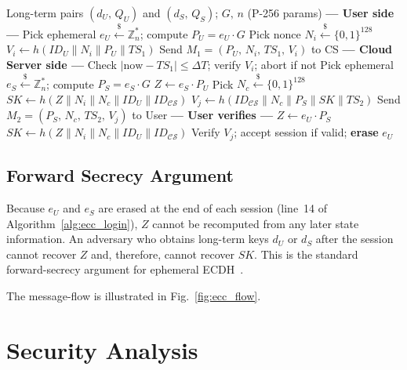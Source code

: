 \documentclass[journal]{IEEEtran}
\newcommand{\ID}{\mathit{ID}}          %
\newcommand{\SK}{\mathit{SK}}          %
\newcommand{\h}[1]{h(#1)}             %
\newcommand{\TS}{\mathit{TS}}          %
\newcommand{\CS}{\mathcal{CS}}         %
\begin{document}
\begin{algorithm}[!t]
\caption{ECC P-256 Login \& Key Agreement}
\label{alg:ecc_login}
\begin{algorithmic}[1]
\Require Long-term pairs $(d_U,\,Q_U)$ and $(d_S,\,Q_S)$; $G,\,n$ (P-256 params)
\Statex \textbf{--- User side ---}
\State Pick ephemeral $e_U \xleftarrow{\$} \mathbb{Z}_n^*$;
       compute $P_U = e_U \cdot G$
\State Pick nonce $N_i \xleftarrow{\$} \{0,1\}^{128}$
\State $V_i \leftarrow \h{\ID_U \| N_i \| P_U \| \TS_1}$
\State Send $M_1 = (P_U,\, N_i,\, \TS_1,\, V_i)$ to CS  
\Statex \textbf{--- Cloud Server side ---}
\State Check $|\text{now} - \TS_1| \leq \Delta T$; verify $V_i$; abort if not
\State Pick ephemeral $e_S \xleftarrow{\$} \mathbb{Z}_n^*$;
       compute $P_S = e_S \cdot G$
\State $Z \leftarrow e_S \cdot P_U$  
\State Pick $N_c \xleftarrow{\$} \{0,1\}^{128}$
\State $\SK \leftarrow \h{Z \| N_i \| N_c \| \ID_U \| \ID_\CS}$
\State $V_j \leftarrow \h{\ID_\CS \| N_c \| P_S \| \SK \| \TS_2}$
\State Send $M_2 = (P_S,\, N_c,\, \TS_2,\, V_j)$ to User  
\Statex \textbf{--- User verifies ---}
\State $Z \leftarrow e_U \cdot P_S$  
\State $\SK \leftarrow \h{Z \| N_i \| N_c \| \ID_U \| \ID_\CS}$
\State Verify $V_j$; accept session if valid; \textbf{erase} $e_U$
\end{algorithmic}
\end{algorithm}

\subsection{Forward Secrecy Argument}

Because $e_U$ and $e_S$ are erased at the end of each session (line~14 of
Algorithm~\ref{alg:ecc_login}), $Z$ cannot be recomputed from any later state
information. An adversary who obtains long-term keys $d_U$ or $d_S$ after the
session cannot recover $Z$ and, therefore, cannot recover $\SK$. This is the
standard forward-secrecy argument for ephemeral ECDH~\cite{RFC8446}.

The message-flow is illustrated in Fig.~\ref{fig:ecc_flow}.



\section{Security Analysis}
\label{sec:security}
\end{document}
